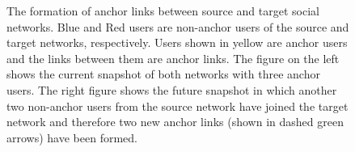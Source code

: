 \documentclass[conference]{IEEEtran}
\begin{document}
\begin{figure}[!t]
\centering
{}
\hfil
{}
\caption{The formation of anchor links between source and target social networks. Blue and Red users are non-anchor users of the source and target networks, respectively. Users shown in yellow are anchor users and the links between them are anchor links. The figure on the left shows the current snapshot of both networks with three anchor users. The right figure shows the future snapshot in which another two non-anchor users from the source network have joined the target network and therefore two new anchor links (shown in dashed green arrows) have been formed.}
\label{fig:intro}
\end{figure}
\end{document}
